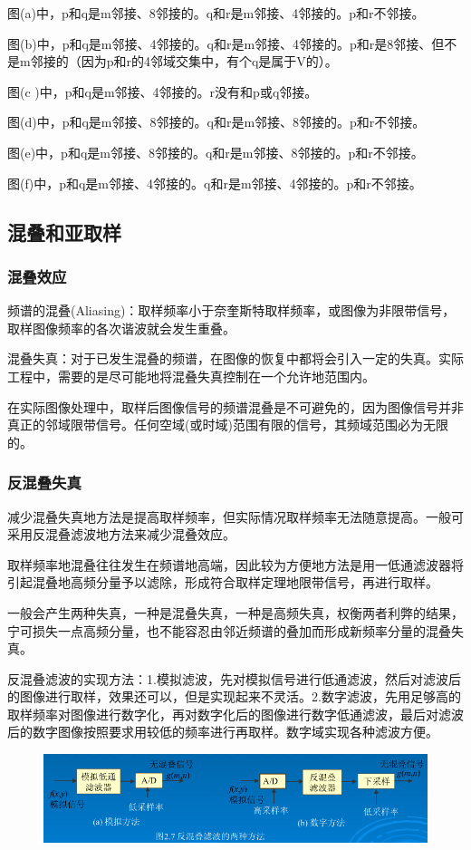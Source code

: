 \documentclass[11pt]{article}
\begin{document}
图(a)中，p和q是m邻接、8邻接的。q和r是m邻接、4邻接的。p和r不邻接。

图(b)中，p和q是m邻接、4邻接的。q和r是m邻接、4邻接的。p和r是8邻接、但不是m邻接的（因为p和r的4邻域交集中，有个q是属于V的）。

图(c )中，p和q是m邻接、4邻接的。r没有和p或q邻接。

图(d)中，p和q是m邻接、8邻接的。q和r是m邻接、8邻接的。p和r不邻接。

图(e)中，p和q是m邻接、8邻接的。q和r是m邻接、8邻接的。p和r不邻接。

图(f)中，p和q是m邻接、4邻接的。q和r是m邻接、4邻接的。p和r不邻接。
\subsection{混叠和亚取样}
\subsubsection{混叠效应}
频谱的混叠(Aliasing)：取样频率小于奈奎斯特取样频率，或图像为非限带信号，取样图像频率的各次谐波就会发生重叠。

混叠失真：对于已发生混叠的频谱，在图像的恢复中都将会引入一定的失真。实际工程中，需要的是尽可能地将混叠失真控制在一个允许地范围内。

在实际图像处理中，取样后图像信号的频谱混叠是不可避免的，因为图像信号并非真正的邻域限带信号。任何空域(或时域)范围有限的信号，其频域范围必为无限的。

\subsubsection{反混叠失真}
减少混叠失真地方法是提高取样频率，但实际情况取样频率无法随意提高。一般可采用反混叠滤波地方法来减少混叠效应。

取样频率地混叠往往发生在频谱地高端，因此较为方便地方法是用一低通滤波器将引起混叠地高频分量予以滤除，形成符合取样定理地限带信号，再进行取样。

一般会产生两种失真，一种是混叠失真，一种是高频失真，权衡两者利弊的结果，宁可损失一点高频分量，也不能容忍由邻近频谱的叠加而形成新频率分量的混叠失真。

反混叠滤波的实现方法：1.模拟滤波，先对模拟信号进行低通滤波，然后对滤波后的图像进行取样，效果还可以，但是实现起来不灵活。2.数字滤波，先用足够高的取样频率对图像进行数字化，再对数字化后的图像进行数字低通滤波，最后对滤波后的数字图像按照要求用较低的频率进行再取样。数字域实现各种滤波方便。

\begin{figure}[h]
	\centering
	\includegraphics[scale = 0.5]{12}
\end{figure}
\end{document}
